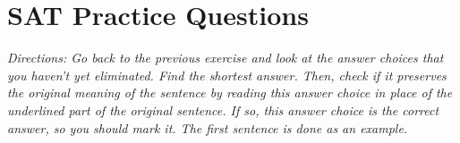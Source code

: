 \section{SAT Practice Questions}



\textit{Directions: Go back to the previous exercise and look at the answer choices that you haven't yet eliminated. Find the shortest answer. Then, check if it preserves the original meaning of the sentence by reading this answer choice in place of the underlined part of the original sentence. If so, this answer choice is the correct answer, so you should mark it. The first sentence is done as an example.}

